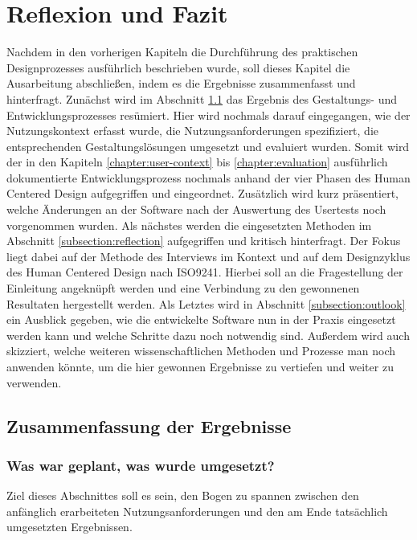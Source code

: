 \chapter{Reflexion und Fazit}
\label{chapter:conclusion}

Nachdem in den vorherigen Kapiteln die Durchführung des praktischen
Designprozesses ausführlich beschrieben wurde, soll dieses Kapitel die
Ausarbeitung abschließen, indem es die Ergebnisse zusammenfasst und
hinterfragt. Zunächst wird im Abschnitt \ref{subsection:resultDescription} das
Ergebnis des Gestaltungs- und Entwicklungsprozesses resümiert. Hier wird
nochmals darauf eingegangen, wie der Nutzungskontext erfasst wurde, die
Nutzungsanforderungen spezifiziert, die entsprechenden Gestaltungslösungen
umgesetzt und evaluiert wurden. Somit wird der in den Kapiteln
\ref{chapter:user-context} bis \ref{chapter:evaluation} ausführlich
dokumentierte Entwicklungsprozess nochmals anhand der vier Phasen des Human
Centered Design aufgegriffen und eingeordnet\cite{ISO9241}. Zusätzlich wird
kurz präsentiert, welche Änderungen an der Software nach der Auswertung des
Usertests noch vorgenommen wurden. Als nächstes werden die eingesetzten
Methoden im Abschnitt \ref{subsection:reflection} aufgegriffen und kritisch
hinterfragt. Der Fokus liegt dabei auf der Methode des Interviews im Kontext
und auf dem Designzyklus des Human Centered Design nach ISO9241. Hierbei soll an
die Fragestellung der Einleitung angeknüpft werden und eine Verbindung zu den
gewonnenen Resultaten hergestellt werden. Als Letztes wird in Abschnitt
\ref{subsection:outlook} ein Ausblick gegeben, wie die entwickelte Software nun
in der Praxis eingesetzt werden kann und welche Schritte dazu noch notwendig
sind. Außerdem wird auch skizziert, welche weiteren wissenschaftlichen Methoden
und Prozesse man noch anwenden könnte, um die hier gewonnen Ergebnisse zu
vertiefen und weiter zu verwenden.

\section{Zusammenfassung der Ergebnisse}
\label{subsection:resultDescription}

\subsection*{Was war geplant, was wurde umgesetzt?}
Ziel dieses Abschnittes soll es sein, den Bogen zu spannen zwischen den
anfänglich erarbeiteten Nutzungsanforderungen und den am Ende tatsächlich
umgesetzten Ergebnissen.

